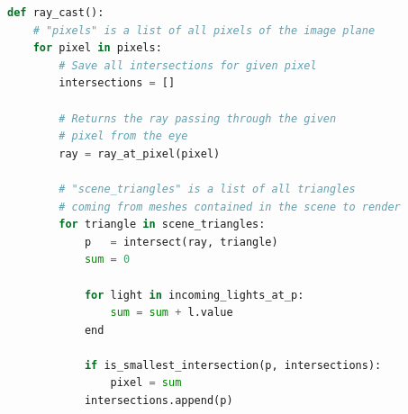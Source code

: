 \begin{lstlisting}[language=Python,caption={Eine abstrakte Umsetzung des Ray
        Casting Verfahrens\protect\footnotemark.},label={fig:ray_casting:high_level},captionpos=b,emph={ray_cast}]
def ray_cast():
    # "pixels" is a list of all pixels of the image plane
    for pixel in pixels:
        # Save all intersections for given pixel
        intersections = []

        # Returns the ray passing through the given
        # pixel from the eye
        ray = ray_at_pixel(pixel)

        # "scene_triangles" is a list of all triangles
        # coming from meshes contained in the scene to render
        for triangle in scene_triangles:
            p   = intersect(ray, triangle)
            sum = 0

            for light in incoming_lights_at_p:
                sum = sum + l.value
            end

            if is_smallest_intersection(p, intersections):
                pixel = sum
            intersections.append(p)
\end{lstlisting}
